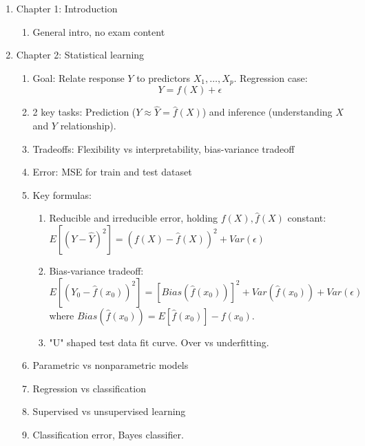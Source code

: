 \documentclass{article}
\begin{document}
\begin{enumerate}
\item Chapter 1: Introduction
\begin{enumerate}
\item General intro, no exam content
\end{enumerate}

\item Chapter 2: Statistical learning
\begin{enumerate}
\item Goal: Relate response $Y$ to predictors $X_1, \dots, X_p$. Regression case: 
\[
Y = f(X) + \epsilon
\]
\item 2 key tasks: Prediction ($Y \approx \hat{Y} = \hat{f}(X)$) and inference (understanding $X$ and $Y$ relationship).
\item Tradeoffs: Flexibility vs interpretability, bias-variance tradeoff
\item Error: MSE for train and test dataset
\item Key formulas:
\begin{enumerate}
\item Reducible and irreducible error, holding $f(X), \hat{f}(X)$ constant: $E[(Y-\hat{Y})^2] = (f(X) - \hat{f}(X))^2 + Var(\epsilon)$
\item Bias-variance tradeoff: $E[(Y_0 - \hat{f}(x_0))^2] = [Bias(\hat{f}(x_0))]^2 + Var(\hat{f}(x_0)) + Var(\epsilon)$ where $Bias(\hat{f}(x_0)) = E[\hat{f}(x_0)] - f(x_0)$.
\item "U" shaped test data fit curve. Over vs underfitting.
\end{enumerate}
\item Parametric vs nonparametric models
\item Regression vs classification
\item Supervised vs unsupervised learning
\item Classification error, Bayes classifier.
\end{enumerate}


\end{enumerate}
\end{document}
